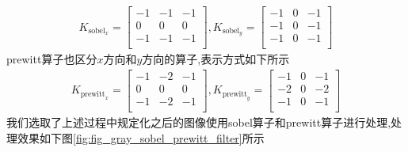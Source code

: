 \documentclass[UTF8,a4paper,10pt]{ctexart}
\begin{document}
\begin{flushleft}
        \begin{eqnarray}
            K_{\text{sobel}_{x}}=\left[\begin{array}{ccc}
                -1 & -1 & -1\\
                0 & 0& 0\\
                -1 & -1 & -1\\
            \end{array}\right],K_{\text{sobel}_{y}}=\left[\begin{array}{ccc}
                -1 & 0 & -1\\
                -1 & 0& -1\\
                -1 & 0 & -1\\
            \end{array}\right]\nonumber
        \end{eqnarray}
        \hspace{2em}prewitt算子也区分$x$方向和$y$方向的算子,表示方式如下所示
        \begin{eqnarray}
            K_{\text{prewitt}_{x}}=\left[\begin{array}{ccc}
                -1 & -2 & -1\\
                0 & 0& 0\\
                -1 & -2 & -1\\
            \end{array}\right],K_{\text{prewitt}_{y}}=\left[\begin{array}{ccc}
                -1 & 0 & -1\\
                -2 & 0& -2\\
                -1 & 0 & -1\\
            \end{array}\right]\nonumber
        \end{eqnarray}
        \hspace{2em}我们选取了上述过程中规定化之后的图像使用sobel算子和prewitt算子进行处理,处理效果如下图\ref{fig:fig_gray_sobel_prewitt_filter}所示
        \begin{figure}[htbp]
            \centering
\end{figure}
\end{flushleft}
\end{document}

